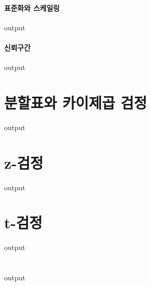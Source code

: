 \documentclass{book}
\begin{document}
\paragraph{표준화와 스케일링}
\begin{Schunk}
\begin{Soutput}
output
\end{Soutput}
\end{Schunk}

\paragraph{신뢰구간}
\begin{Schunk}
\begin{Soutput}
output
\end{Soutput}
\end{Schunk}

\section{분할표와 카이제곱 검정}
\begin{Schunk}
\begin{Soutput}
output
\end{Soutput}
\end{Schunk}

\section{z-검정}
\begin{Schunk}
\begin{Soutput}
output
\end{Soutput}
\end{Schunk}

\section{t-검정}
\begin{Schunk}
\begin{Soutput}
output
\end{Soutput}
\end{Schunk}

\section{}
\begin{Schunk}
\begin{Soutput}
output
\end{Soutput}
\end{Schunk}
\end{document}
